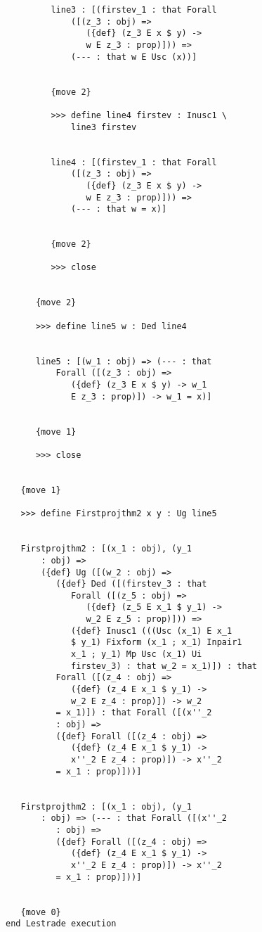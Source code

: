 \documentclass[12pt]{article}
\begin{document}
\begin{verbatim}
         line3 : [(firstev_1 : that Forall 
             ([(z_3 : obj) => 
                ({def} (z_3 E x $ y) -> 
                w E z_3 : prop)])) => 
             (--- : that w E Usc (x))]


         {move 2}

         >>> define line4 firstev : Inusc1 \
             line3 firstev


         line4 : [(firstev_1 : that Forall 
             ([(z_3 : obj) => 
                ({def} (z_3 E x $ y) -> 
                w E z_3 : prop)])) => 
             (--- : that w = x)]


         {move 2}

         >>> close


      {move 2}

      >>> define line5 w : Ded line4


      line5 : [(w_1 : obj) => (--- : that 
          Forall ([(z_3 : obj) => 
             ({def} (z_3 E x $ y) -> w_1 
             E z_3 : prop)]) -> w_1 = x)]


      {move 1}

      >>> close


   {move 1}

   >>> define Firstprojthm2 x y : Ug line5


   Firstprojthm2 : [(x_1 : obj), (y_1 
       : obj) => 
       ({def} Ug ([(w_2 : obj) => 
          ({def} Ded ([(firstev_3 : that 
             Forall ([(z_5 : obj) => 
                ({def} (z_5 E x_1 $ y_1) -> 
                w_2 E z_5 : prop)])) => 
             ({def} Inusc1 (((Usc (x_1) E x_1 
             $ y_1) Fixform (x_1 ; x_1) Inpair1 
             x_1 ; y_1) Mp Usc (x_1) Ui 
             firstev_3) : that w_2 = x_1)]) : that 
          Forall ([(z_4 : obj) => 
             ({def} (z_4 E x_1 $ y_1) -> 
             w_2 E z_4 : prop)]) -> w_2 
          = x_1)]) : that Forall ([(x''_2 
          : obj) => 
          ({def} Forall ([(z_4 : obj) => 
             ({def} (z_4 E x_1 $ y_1) -> 
             x''_2 E z_4 : prop)]) -> x''_2 
          = x_1 : prop)]))]


   Firstprojthm2 : [(x_1 : obj), (y_1 
       : obj) => (--- : that Forall ([(x''_2 
          : obj) => 
          ({def} Forall ([(z_4 : obj) => 
             ({def} (z_4 E x_1 $ y_1) -> 
             x''_2 E z_4 : prop)]) -> x''_2 
          = x_1 : prop)]))]


   {move 0}
end Lestrade execution
\end{verbatim}
\end{document}
